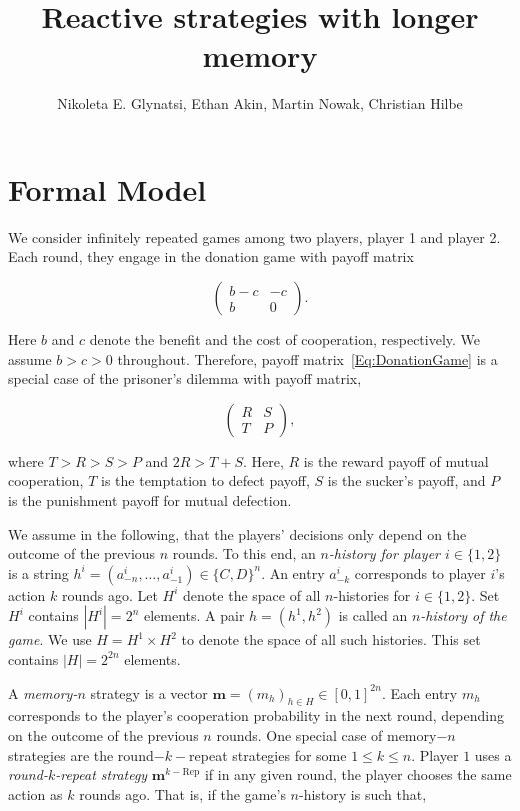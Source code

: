 \documentclass{article}
\title{Reactive strategies with longer memory}
\author{Nikoleta E. Glynatsi, Ethan Akin, Martin Nowak, Christian Hilbe}
\date{}
\theoremstyle{definition}
\begin{document}
\maketitle

\section{Formal Model}

We consider infinitely repeated games among two players, player 1 and
player 2. Each round, they engage in the donation game with payoff matrix

\begin{equation} \label{Eq:DonationGame}
\left(
\begin{array}{cc}
b-c	&-c\\
b	&0
\end{array}
\right).
\end{equation}

Here $b$ and $c$ denote the benefit and the cost of cooperation, respectively. 
We assume $b\!>\!c\!>\!0$ throughout.
Therefore, payoff matrix~\eqref{Eq:DonationGame} is a special case of the
prisoner's dilemma with payoff matrix,

\begin{equation} \label{Eq:PrisonerDilemma}
    \left(
    \begin{array}{cc}
    R & S\\
    T & P
    \end{array}
    \right),
\end{equation}

where $T > R > S > P$ and $2 R > T + S$. Here, $R$ is the reward payoff of mutual
cooperation, $T$ is the temptation to defect payoff, $S$ is the sucker's payoff,
and $P$ is the punishment payoff for mutual defection.

We assume in the following, that the players' decisions only depend on the
outcome of the previous $n$ rounds. To this end, an {\it $n$-history for player
$i \in \{1, 2\}$} is a string $h^i=(a^i_{-n},\ldots,a^i_{-1})\!\in\!\{C,D\}^n$. An entry
$a^i_{-k}$ corresponds to player $i$'s action $k$ rounds ago. Let $H^i$ denote
the space of all $n$-histories for $i \in \{1, 2\}$. Set $H^i$
contains $|H^i|=2^{n}$ elements. A pair $h\!=\!(h^1,h^2)$ is called an {\it
$n$-history of the game}. We use $H=H^1\times H^2$ to denote the space of all
such histories. This set contains $|H|=2^{2n}$ elements.

A {\it memory-$n$} strategy is a vector $\mathbf{m}=(m_h)_{h\in
H}\in[0,1]^{2n}$. Each entry $m_h$ corresponds to the player's cooperation
probability in the next round, depending on the outcome of the previous $n$
rounds. One special case of memory$-n$ strategies are the round$-k-$repeat
strategies for some $1\!\le\!k\!\le\!n$. Player $1$ uses a {\it round-$k$-repeat
strategy} $\mathbf{m}^{k-\text{Rep}}$ if in any given round, the player chooses
the same action as $k$ rounds ago. That is, if the game's $n$-history is such
that,
\end{document}
